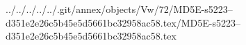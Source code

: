 ../../../../../.git/annex/objects/Vw/72/MD5E-s5223--d351e2e26c5b45e5d5661bc32958ac58.tex/MD5E-s5223--d351e2e26c5b45e5d5661bc32958ac58.tex